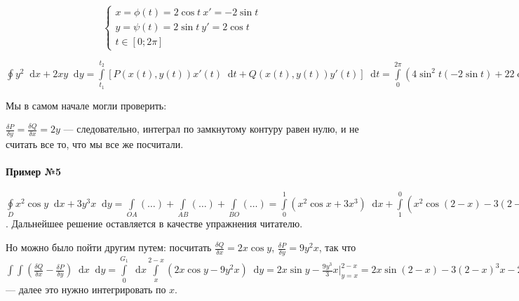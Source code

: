 \documentclass{article}
\newcommand*\diff{\mathop{}\!\mathrm{d}}
\begin{document}
\begin{equation}
    \begin{cases}
        x = \phi(t) = 2 \cos t \ x' = -2 \sin t \\
        y = \psi(t) = 2 \sin t \ y' = 2 \cos t \\
        t \in [0; 2\pi]
    \end{cases}
\end{equation}

$\oint y^2 \diff x + 2 x y \diff y = \int\limits_{t_1}^{t_2} [P(x(t), y(t)) x'(t) \diff t + Q(x(t), y(t)) y'(t)] \diff t = \int\limits_{0}^{2 \pi} (4 \sin^2 t (-2 \sin t) + 2 2 \cos t 2 \sin t 2 \cos t) \diff t = 8 \int\limits_{0}^{2 \pi} \sin t (-\sin^2 t + 2 \cos^2 t) \diff t = -8 \int\limits_{0}^{2 \pi} (-1 + 3\cos^2 t) \diff \cos t = 8 \int\limits_{0}^{2 \pi} (1 - 3 \cos^2 t) \diff \cos t = 8 (\cos t - \frac{3 \cos^3 t}{3}) \bigg|_{0}^{2 \pi} = 0$


Мы в самом начале могли проверить:

$\frac{\delta P}{\delta y} = \frac{\delta Q}{\delta x} = 2y$ — следовательно, интеграл по замкнутому контуру равен нулю, и не считать все то, что мы все же посчитали.

\paragraph{Пример №5}

$\oint\limits_{D} x^2 \cos y \diff x + 3y^3 x \diff y = \int\limits_{OA} (\dots) + \int\limits_{AB} (\dots) + \int\limits_{BO} (\dots) = \int\limits_{0}^{1} (x^2 \cos x + 3x^3) \diff x + \int\limits_{1}^{0} (x^2 \cos (2 - x) - 3 (2 - x)^3 x) \diff x + 0 = \dots$. Дальнейшее решение оставляется в качестве упражнения читателю.

Но можно было пойти другим путем: посчитать $\frac{\delta Q}{\delta x} = 2 x \cos y$, $\frac{\delta P}{\delta y} = 9 y^2 x$, так что $\int\int (\frac{\delta Q}{\delta x} - \frac{\delta P}{\delta y}) \diff x \diff y = \int\limits_{0}^{G_1} \diff x \int\limits_{x}^{2 - x} (2x \cos y - 9y^2 x) \diff y = 2 x \sin y - \frac{9 y^3}{3} x \bigg|_{y = x}^{2 - x} = 2 x \sin (2 - x) - 3 (2 - x)^3 x - 2x \sin x - 3x^4$ — далее это нужно интегрировать по $x$.
\end{document}
